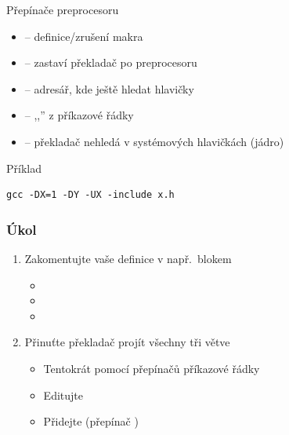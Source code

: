 \begin{frame}[fragile]{Přepínače preprocesoru}

  \begin{itemize}[<+->]
    \item {}  -- definice/zrušení makra
    \item {} -- zastaví překladač po preprocesoru
    \item {} -- adresář, kde ještě hledat hlavičky
    \item {} -- ,,'' z příkazové řádky
    \item {} -- překladač nehledá v systémových hlavičkách (jádro)
  \end{itemize}

  \medskip

  \begin{block}{Příklad}
    \begin{lstlisting}[language=XML]
gcc -DX=1 -DY -UX -include x.h
    \end{lstlisting}
  \end{block}

\end{frame}

\begin{frame}
  \frametitle{Úkol}

  \begin{enumerate}
    \item Zakomentujte vaše definice v  např.\ blokem
    \begin{itemize}
      \item {}
      \item {}
      \item {}
    \end{itemize}

    \item Přinuťte překladač projít všechny tři větve
    \begin{itemize}
      \item Tentokrát pomocí přepínačů příkazové řádky
      \item Editujte 
      \item Přidejte  (přepínač )
    \end{itemize}

  \end{enumerate}
\end{frame}


